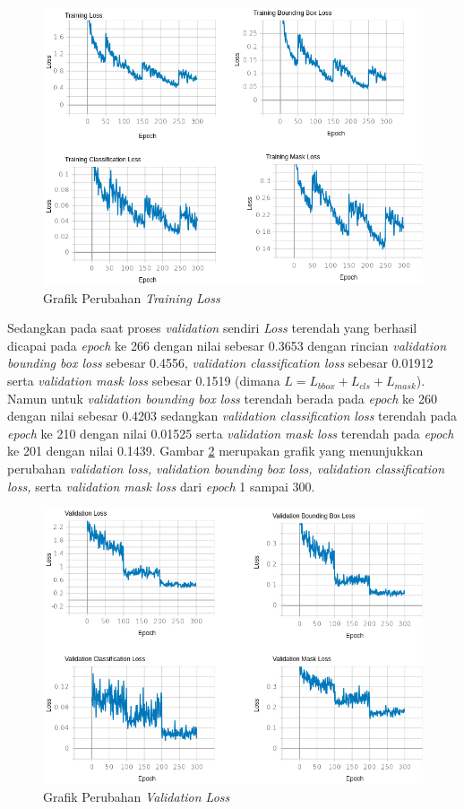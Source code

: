 \begin{figure}[ht]
	\centering
	\includegraphics[scale=0.4]{gambar/resnet50-training.png}
	\caption{Grafik Perubahan \textit{Training Loss}}
	\label{fig:resnet50-training}
\end{figure}

Sedangkan pada saat proses \textit{validation} sendiri \textit{Loss} terendah yang berhasil dicapai pada \textit{epoch} ke 266 dengan nilai sebesar 0.3653 dengan rincian \textit{validation bounding box loss} sebesar 0.4556, \textit{validation classification loss} sebesar 0.01912 serta \textit{validation mask loss} sebesar 0.1519 (dimana $L=L_{bbox}+L_{cls}+L_{mask}$). Namun untuk \textit{validation bounding box loss} terendah berada pada \textit{epoch} ke 260 dengan nilai sebesar 0.4203 sedangkan \textit{validation classification loss} terendah pada \textit{epoch} ke 210 dengan nilai 0.01525 serta \textit{validation mask loss} terendah pada \textit{epoch} ke 201 dengan nilai 0.1439. Gambar \ref{fig:resnet50-val} merupakan grafik yang menunjukkan perubahan \textit{validation loss, validation bounding box loss, validation classification loss,} serta \textit{validation mask loss} dari \textit{epoch} 1 sampai 300.

\begin{figure}[ht]
	\centering
	\includegraphics[scale=0.4]{gambar/resnet50-val.png}
	\caption{Grafik Perubahan \textit{Validation Loss}}
	\label{fig:resnet50-val}
\end{figure}

